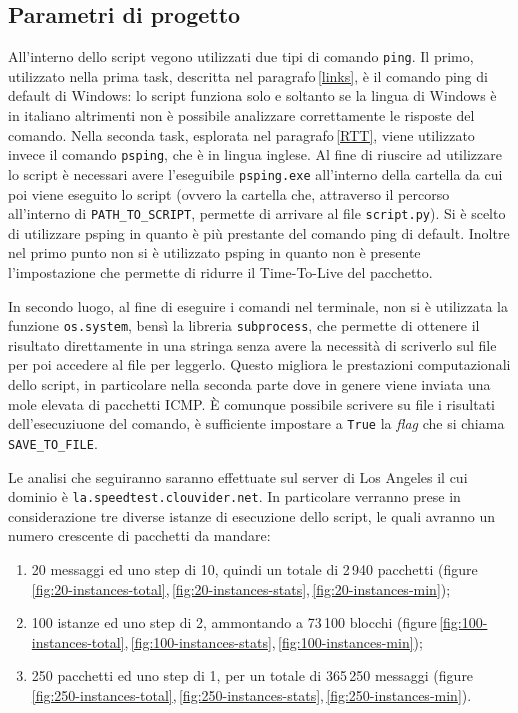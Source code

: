 \vspace{10px}\subsection{Parametri di progetto}

All'interno dello script vegono utilizzati due tipi di comando \texttt{ping}. Il primo, utilizzato nella prima task, descritta nel paragrafo\,\ref{links}, è il comando ping di default di Windows: lo script funziona solo e soltanto se la lingua di Windows è in italiano altrimenti non è possibile analizzare correttamente le risposte del comando. Nella seconda task, esplorata nel paragrafo\,\ref{RTT}, viene utilizzato invece il comando \texttt{psping}, che è in lingua inglese. Al fine di riuscire ad utilizzare lo script è necessari avere l'eseguibile \texttt{psping.exe} all'interno della cartella da cui poi viene eseguito lo script (ovvero la cartella che, attraverso il percorso all'interno di \texttt{PATH\_TO\_SCRIPT}, permette di arrivare al file \texttt{script.py}). Si è scelto di utilizzare psping in quanto è più prestante del comando ping di default. Inoltre nel primo punto non si è utilizzato psping in quanto non è presente l'impostazione che permette di ridurre il Time-To-Live del pacchetto.

In secondo luogo, al fine di eseguire i comandi nel terminale, non si è utilizzata la funzione \texttt{os.system}, bensì la libreria \texttt{subprocess}, 
che permette di ottenere il risultato direttamente in una stringa senza avere la necessità di scriverlo sul file per poi accedere al file per leggerlo. Questo migliora le prestazioni computazionali dello script, in particolare nella seconda parte dove in genere viene inviata una mole elevata di pacchetti ICMP. È comunque possibile scrivere su file i risultati dell'esecuziuone del comando, è sufficiente impostare a \texttt{True} la \textsl{flag} che si chiama \texttt{SAVE\_TO\_FILE}.

Le analisi che seguiranno saranno effettuate sul server di Los Angeles il cui dominio è \texttt{la.speedtest.clouvider.net}. In particolare verranno prese in considerazione tre diverse istanze di esecuzione dello script, le quali avranno un numero crescente di pacchetti da mandare:

\begin{enumerate}
    \setlength{\itemsep}{4px}
    \item 20 messaggi ed uno step di 10, quindi un totale di 2\,940 pacchetti (figure\,\ref{fig:20-instances-total},\,\ref{fig:20-instances-stats},\,\ref{fig:20-instances-min});
    \item 100 istanze ed uno step di 2, ammontando a 73\,100 blocchi (figure\,\ref{fig:100-instances-total},\,\ref{fig:100-instances-stats},\,\ref{fig:100-instances-min});
    \item 250 pacchetti ed uno step di 1, per un totale di 365\,250 messaggi (figure\,\ref{fig:250-instances-total},\,\ref{fig:250-instances-stats},\,\ref{fig:250-instances-min}).
\end{enumerate}



